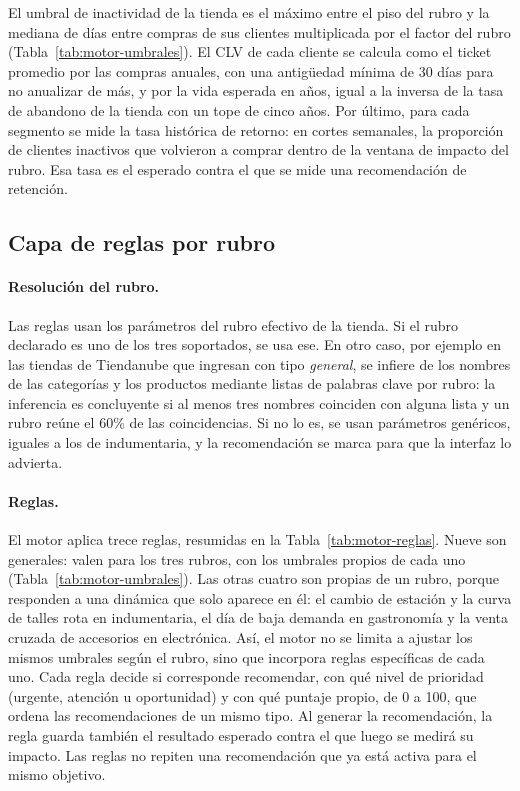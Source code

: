 El umbral de inactividad de la tienda es el máximo entre el piso del rubro y la mediana de días entre compras de sus clientes multiplicada por el factor del rubro (Tabla~\ref{tab:motor-umbrales}). El CLV de cada cliente se calcula como el ticket promedio por las compras anuales, con una antigüedad mínima de 30 días para no anualizar de más, y por la vida esperada en años, igual a la inversa de la tasa de abandono de la tienda con un tope de cinco años. Por último, para cada segmento se mide la tasa histórica de retorno: en cortes semanales, la proporción de clientes inactivos que volvieron a comprar dentro de la ventana de impacto del rubro. Esa tasa es el esperado contra el que se mide una recomendación de retención.

\subsection{Capa de reglas por rubro}
\label{sec:motor-reglas}

\paragraph{Resolución del rubro.} Las reglas usan los parámetros del rubro efectivo de la tienda. Si el rubro declarado es uno de los tres soportados, se usa ese. En otro caso, por ejemplo en las tiendas de Tiendanube que ingresan con tipo \emph{general}, se infiere de los nombres de las categorías y los productos mediante listas de palabras clave por rubro: la inferencia es concluyente si al menos tres nombres coinciden con alguna lista y un rubro reúne el 60\% de las coincidencias. Si no lo es, se usan parámetros genéricos, iguales a los de indumentaria, y la recomendación se marca para que la interfaz lo advierta.

\paragraph{Reglas.} El motor aplica trece reglas, resumidas en la Tabla~\ref{tab:motor-reglas}. Nueve son generales: valen para los tres rubros, con los umbrales propios de cada uno (Tabla~\ref{tab:motor-umbrales}). Las otras cuatro son propias de un rubro, porque responden a una dinámica que solo aparece en él: el cambio de estación y la curva de talles rota en indumentaria, el día de baja demanda en gastronomía y la venta cruzada de accesorios en electrónica. Así, el motor no se limita a ajustar los mismos umbrales según el rubro, sino que incorpora reglas específicas de cada uno. Cada regla decide si corresponde recomendar, con qué nivel de prioridad (urgente, atención u oportunidad) y con qué puntaje propio, de 0 a 100, que ordena las recomendaciones de un mismo tipo. Al generar la recomendación, la regla guarda también el resultado esperado contra el que luego se medirá su impacto. Las reglas no repiten una recomendación que ya está activa para el mismo objetivo.

